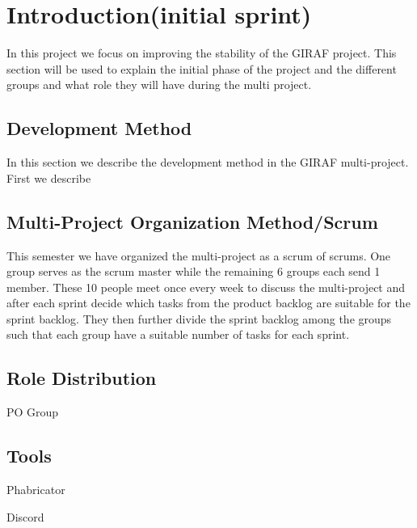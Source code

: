 \chapter{Introduction(initial sprint)}

In this project we focus on improving the stability of the GIRAF project. This
section will be used to explain the initial phase of the project and the
different groups and what role they will have during the multi project.


\section{Development Method}
In this section we describe the development method in the GIRAF multi-project.
First we describe 





\section{Multi-Project Organization Method/Scrum}
 This semester we have organized the multi-project as a scrum of
scrums. One group serves as the scrum master while the remaining 6 groups each send 1
member. These 10 people meet once every week to discuss the multi-project
and after each sprint decide which tasks from the product backlog are suitable
for the sprint backlog. They then further divide the sprint backlog among the
groups such that each group have a suitable number of tasks for each sprint.\nl


\section{Role Distribution}

PO Group



\section{Tools}

Phabricator

Discord

